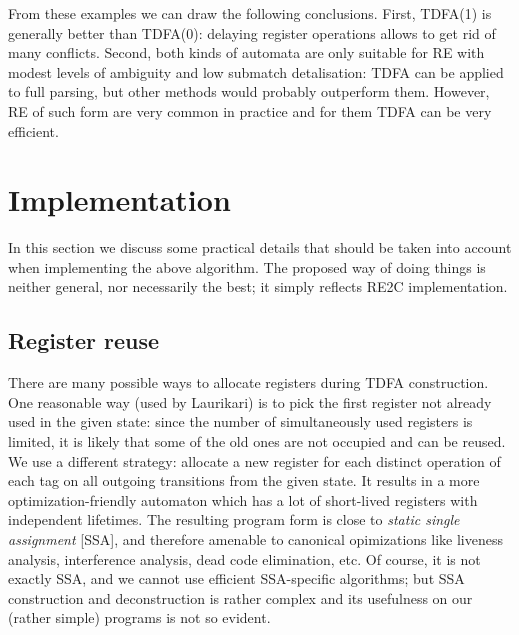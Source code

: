 \documentclass{article}
\theoremstyle{definition}
\begin{document}
\begin{multicols}{2}

From these examples we can draw the following conclusions.
First, TDFA(1) is generally better than TDFA(0): delaying register operations allows to get rid of many conflicts.
Second, both kinds of automata are only suitable for RE with modest levels of ambiguity
and low submatch detalisation: TDFA can be applied to full parsing, but other methods would probably outperform them.
However, RE of such form are very common in practice and for them TDFA can be very efficient.



\section{Implementation}\label{section_implementation}

In this section we discuss some practical details that should be taken into account when implementing the above algorithm.
The proposed way of doing things is neither general, nor necessarily the best;
it simply reflects RE2C implementation.

\subsection*{Register reuse}

There are many possible ways to allocate registers during TDFA construction.
One reasonable way (used by Laurikari) is to pick the first register not already used in the given state:
since the number of simultaneously used registers is limited,
it is likely that some of the old ones are not occupied and can be reused.
We use a different strategy: allocate a new register for each distinct operation of each tag on all outgoing transitions from the given state.
It results in a more optimization-friendly automaton
which has a lot of short-lived registers with independent lifetimes.
The resulting program form is close to \emph{static single assignment} [SSA],
and therefore amenable to canonical opimizations like liveness analysis, interference analysis, dead code elimination, etc.
Of course, it is not exactly SSA, and we cannot use efficient SSA-specific algorithms;
but SSA construction and deconstruction is rather complex and its usefulness on our (rather simple) programs is not so evident.
\\


\end{multicols}
\end{document}
